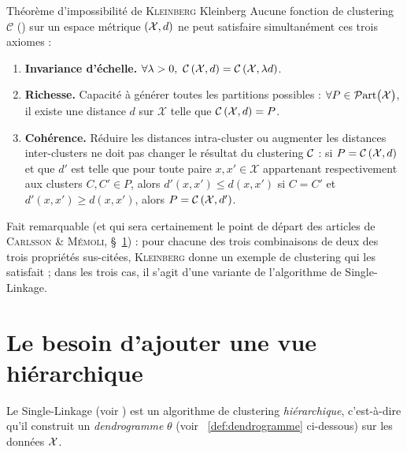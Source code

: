 \begin{Resultat}{Théorème d'impossibilité de \textsc{Kleinberg} \cite{Kleinberg2002}}{Kleinberg}
Aucune fonction de clustering $ \mathcal C$ () sur un espace métrique $(\mathcal{X}, d)$ ne peut satisfaire simultanément ces trois axiomes : 
\begin{enumerate}[label=(\roman*)]
    \item \textbf{Invariance d'échelle.}  $\forall \lambda > 0, \ \mathcal{C} \left(\mathcal{X}, d \right) = \mathcal{C} \left(\mathcal{X},  \lambda d \right)$.
    \item \textbf{Richesse.} Capacité à générer toutes les partitions possibles : $\forall P \in \mathcal{P}\mathrm{art}\bigl( \mathcal X \bigr)$, il existe une distance $d$ sur $\mathcal X $ telle que $\mathcal{C} \left(\mathcal{X}, d \right) = P$.
    \item \textbf{Cohérence.} Réduire les distances intra-cluster ou augmenter les distances inter-clusters ne doit pas changer le résultat du clustering $\mathcal{C}$ : si $P = \mathcal{C} \left(\mathcal{X}, d \right)$ et que $d'$ est telle que pour toute paire $x,x'\in \mathcal X$ appartenant respectivement aux clusters $C,C' \in P$, alors $d'(x,x') \le d(x,x')$ si $C =C'$ et $d'(x,x') \ge d(x,x')$, alors $P = \mathcal{C} \left(\mathcal{X}, d' \right)$.
\end{enumerate}
\end{Resultat}



Fait remarquable (et qui sera certainement le point de départ des articles de \textsc{Carlsson \& Mémoli}, \cf{} \S~\ref{sec:clusteringHierarchique}) : pour chacune des trois combinaisons de deux des trois propriétés sus-citées, \textsc{Kleinberg} donne un exemple de clustering qui les satisfait ; dans les trois cas, il s'agit d'une variante de l'algorithme de {Single-Linkage}.


\section{Le besoin d'ajouter une vue hiérarchique}\label{sec:clusteringHierarchique}

Le Single-Linkage (voir ) est un algorithme de clustering \emph{hiérarchique}, c'est-à-dire qu'il construit un \emph{dendrogramme} $\theta$ (voir \Def~\ref{def:dendrogramme} ci-dessous) sur les données $\mathcal{X}$. %




